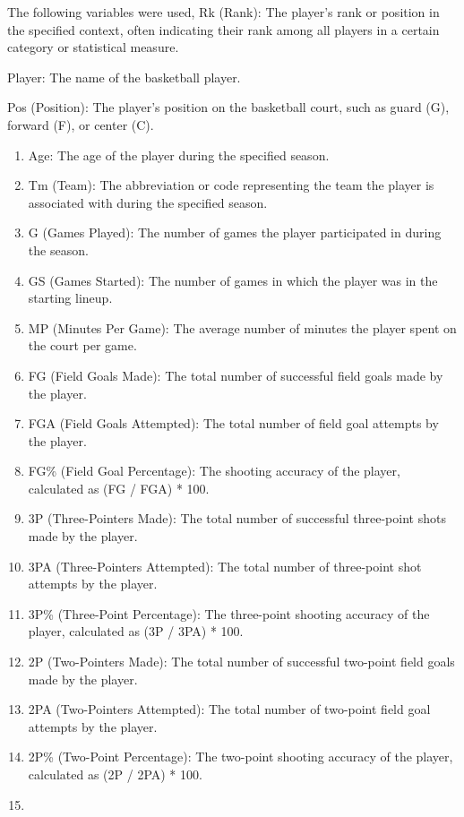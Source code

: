 \documentclass[
]{article}
\begin{document}
The following variables were used, Rk (Rank): The player's rank or
position in the specified context, often indicating their rank among all
players in a certain category or statistical measure.

Player: The name of the basketball player.

Pos (Position): The player's position on the basketball court, such as
guard (G), forward (F), or center (C).

\begin{enumerate}
\def\labelenumi{\arabic{enumi}.}
\item
  Age: The age of the player during the specified season.
\item
  Tm (Team): The abbreviation or code representing the team the player
  is associated with during the specified season.
\item
  G (Games Played): The number of games the player participated in
  during the season.
\item
  GS (Games Started): The number of games in which the player was in the
  starting lineup.
\item
  MP (Minutes Per Game): The average number of minutes the player spent
  on the court per game.
\item
  FG (Field Goals Made): The total number of successful field goals made
  by the player.
\item
  FGA (Field Goals Attempted): The total number of field goal attempts
  by the player.
\item
  FG\% (Field Goal Percentage): The shooting accuracy of the player,
  calculated as (FG / FGA) * 100.
\item
  3P (Three-Pointers Made): The total number of successful three-point
  shots made by the player.
\item
  3PA (Three-Pointers Attempted): The total number of three-point shot
  attempts by the player.
\item
  3P\% (Three-Point Percentage): The three-point shooting accuracy of
  the player, calculated as (3P / 3PA) * 100.
\item
  2P (Two-Pointers Made): The total number of successful two-point field
  goals made by the player.
\item
  2PA (Two-Pointers Attempted): The total number of two-point field goal
  attempts by the player.
\item
  2P\% (Two-Point Percentage): The two-point shooting accuracy of the
  player, calculated as (2P / 2PA) * 100.
\item

\end{enumerate}
\end{document}
